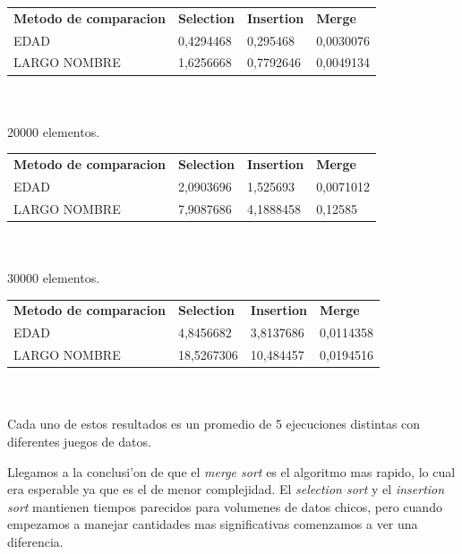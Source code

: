 \documentclass{article}
\begin{document}
	\begin{tabular}{llll}
		\textbf{Metodo de comparacion} & \textbf{Selection} & \textbf{Insertion} & \textbf{Merge} \\
		EDAD & 0,4294468 & 0,295468 & 0,0030076 \\
		LARGO NOMBRE & 1,6256668 & 0,7792646 & 0,0049134 \\
	\end{tabular}\\\\

	20000 elementos.
	
	\begin{tabular}{llll}
		\textbf{Metodo de comparacion} & \textbf{Selection} & \textbf{Insertion} & \textbf{Merge} \\
		EDAD & 2,0903696 & 1,525693 & 0,0071012 \\
		LARGO NOMBRE & 7,9087686 & 4,1888458 & 0,12585 \\
	\end{tabular}\\\\

	30000 elementos.
	
	\begin{tabular}{llll}
		\textbf{Metodo de comparacion} & \textbf{Selection} & \textbf{Insertion} & \textbf{Merge} \\
		EDAD & 4,8456682 & 3,8137686 & 0,0114358 \\
		LARGO NOMBRE & 18,5267306 & 10,484457 & 0,0194516 \\
	\end{tabular}\\\\

	Cada uno de estos resultados es un promedio de 5 ejecuciones distintas con diferentes juegos de datos.
	
	Llegamos a la conclusi'on de que el \emph{merge sort} es el algoritmo mas rapido, lo cual era esperable ya que es el de menor complejidad. El \emph{selection sort} y el \emph{insertion sort} mantienen tiempos parecidos para volumenes de datos chicos, pero cuando empezamos a manejar cantidades mas significativas comenzamos a ver una diferencia. 
\end{document}
